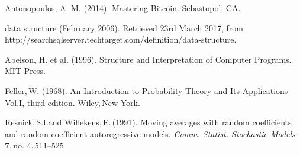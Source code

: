 \begin{thebibliography}{99}



{\sc Antonopoulos, A. M.} (2014).
Mastering Bitcoin.
{\em} Sebastopol, CA.

{\sc data structure} (February 2006). Retrieved 23rd March 2017, from http://searchsqlserver.techtarget.com/definition/data-structure.

{\sc Abelson, H. et al.} (1996).
Structure and Interpretation of Computer Programs.
MIT Press.


{\sc Feller,\,W.} (1968).
An Introduction to Probability Theory and Its Applications Vol.I, third edition.
{\em}Wiley,\,New York.

{\sc Resnick,\,S.I.and Willekens,\,E.}\,(1991).
Moving averages with random coefficients and random coefficient autoregressive models.
{\em Comm. Statist. Stochastic Models} \,{\bf 7},\,no. 4,\,511--525

\end{thebibliography}
